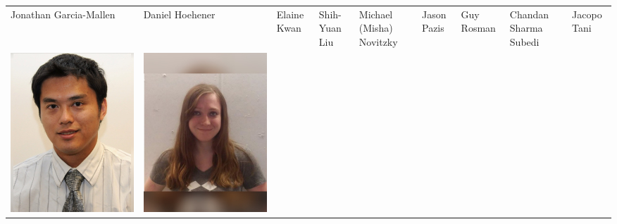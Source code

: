 \documentclass[landscape,a0paper,fontscale=0.292]{baposter}
\begin{document}
\begin{poster}
{\begin{center}
\begin{tabularx}{\linewidth}{X X X X X X X X X}
{\tiny \centering Jonathan Garcia-Mallen }& {\tiny \centering Daniel Hoehener }& {\tiny \centering Elaine Kwan }& {\tiny \centering Shih-Yuan Liu }& {\tiny \centering Michael (Misha) Novitzky }& {\tiny \centering Jason Pazis }& {\tiny \centering Guy Rosman }& {\tiny \centering Chandan Sharma Subedi }& {\tiny \centering Jacopo Tani }\\ 
 {\centering \includegraphics[width=0.65\linewidth]{wang.jpg}}&
{\centering \includegraphics[width=0.65\linewidth]{waller.jpg}}&

\end{tabularx}
\end{center}}
\end{poster}
\end{document}
